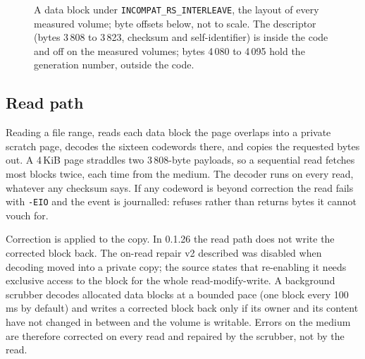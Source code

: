 \begin{figure}[t]
\centering
{}
\caption{A \bfs data block under \texttt{INCOMPAT\_RS\_INTERLEAVE}, the
layout of every measured volume; byte offsets below, not to scale. The
descriptor (bytes 3\,808 to 3\,823, checksum and self-identifier) is
inside the code and off on the measured volumes; bytes 4\,080 to 4\,095
hold the generation number, outside the code.}
\label{fig:capsule}
\end{figure}

\subsection{Read path}\label{sec:readpath}

Reading a file range, \bfs reads each data block the page overlaps into
a private scratch page, decodes the sixteen codewords there, and copies
the requested bytes out. A 4\,KiB page straddles two 3\,808-byte
payloads, so a sequential read fetches most blocks twice, each time from
the medium. The decoder runs on every read, whatever any checksum says.
If any codeword is beyond correction the read fails with
\texttt{-EIO} and the event is journalled: \bfs refuses rather than
returns bytes it cannot vouch for.

Correction is applied to the copy. In 0.1.26 the read path does not
write the corrected block back. The on-read repair v2 described was
disabled when decoding moved into a private copy; the source states
that re-enabling it needs exclusive access to the block for the whole
read-modify-write. A background scrubber
decodes allocated data blocks at a bounded pace (one block every
100\,ms by default) and writes a corrected block back only if its owner
and its content have not changed in between and the volume is writable.
Errors on the medium are therefore corrected on every read and repaired
by the scrubber, not by the read.

